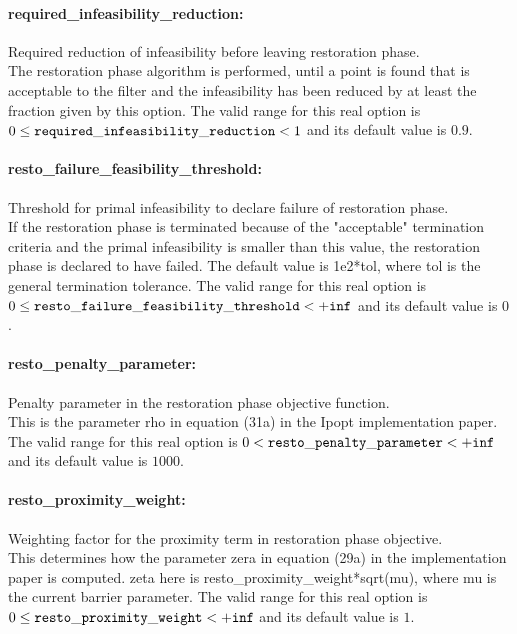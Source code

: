 \paragraph{required\_infeasibility\_reduction:}\label{opt:required_infeasibility_reduction} Required reduction of infeasibility before leaving restoration phase. \\
 The restoration phase algorithm is performed, until a point is found that is acceptable to the filter and the infeasibility has been reduced by at least the fraction given by this option. The valid range for this real option is 
$0 \le {\tt required\_infeasibility\_reduction } <  1$
and its default value is $0.9$.


\paragraph{resto\_failure\_feasibility\_threshold:}\label{opt:resto_failure_feasibility_threshold} Threshold for primal infeasibility to declare failure of restoration phase. \\
 If the restoration phase is terminated because of the "acceptable" termination criteria and the primal infeasibility is smaller than this value, the restoration phase is declared to have failed.  The default value is 1e2*tol, where tol is the general termination tolerance. The valid range for this real option is 
$0 \le {\tt resto\_failure\_feasibility\_threshold } <  {\tt +inf}$
and its default value is $0$.


\paragraph{resto\_penalty\_parameter:}\label{opt:resto_penalty_parameter} Penalty parameter in the restoration phase objective function. \\
 This is the parameter rho in equation (31a) in the Ipopt implementation paper. The valid range for this real option is 
$0 <  {\tt resto\_penalty\_parameter } <  {\tt +inf}$
and its default value is $1000$.


\paragraph{resto\_proximity\_weight:}\label{opt:resto_proximity_weight} Weighting factor for the proximity term in restoration phase objective. \\
 This determines how the parameter zera in equation (29a) in the implementation paper is computed.  zeta here is resto\_proximity\_weight*sqrt(mu), where mu is the current barrier parameter. The valid range for this real option is 
$0 \le {\tt resto\_proximity\_weight } <  {\tt +inf}$
and its default value is $1$.


